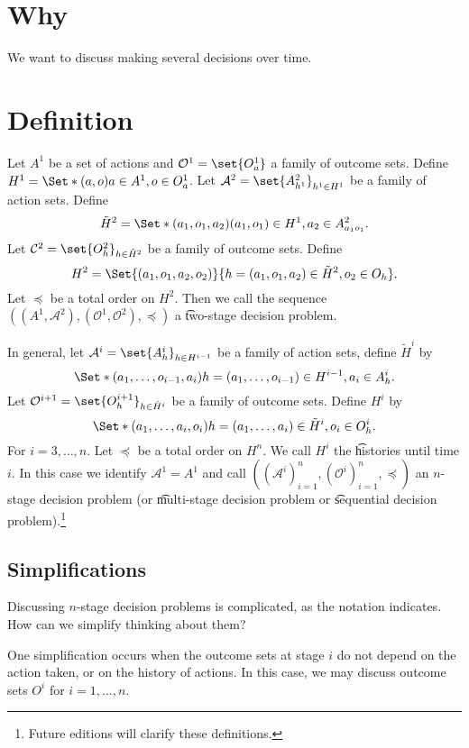 
\section*{Why}

We want to discuss making several decisions over time.

\section*{Definition}

Let $A^{1}$ be a set of actions and $\mathcal{O}^1 = \set{O^{1}_a}$ a family of outcome sets.
Define $H^1 = \Set*{(a, o)}{a \in A^1, o \in O^{1}_a}$.
Let $\mathcal{A} ^2 = \set{A^{2}_{h^1}}_{h^1 \in H^1}$ be a family of action sets.
Define
\[
\tilde{H}^{2} = \Set*{(a_1, o_1, a_2)}{(a_1, o_1) \in H^1, a_2 \in A^{2}_{a_1o_1}}.
\]
Let $\mathcal{C}^2 = \set{O^{2}_{h}}_{h \in \tilde{H}^2}$ be a family of outcome sets.
Define
\[
H^2 = \Set{(a_1, o_1, a_2, o_2)}{h = (a_1, o_1, a_2) \in \tilde{H}^2, o_2 \in O_{h}}.
\]
Let $\preceq$ be a total order on $H^2$.
Then we call the sequence $((A^1, \mathcal{A} ^2), (\mathcal{O}^1, \mathcal{O}^2), \preceq)$ a \t{two-stage decision problem}.

In general, let $\mathcal{A} ^{i} = \set{A^i_{h}}_{h \in H^{i-1}}$ be a family of action sets, define $\tilde{H}^i$ by
\[
\Set*{(a_1, \dots , o_{i-1}, a_i)}{h = (a_1, \dots , o_{i-1}) \in H^{i-1}, a_i \in A^i_{h}}.
\]
Let $\mathcal{O}^{i+1} = \set{O^{i+1}_{h}}_{h \in \tilde{H}^{i}}$ be a family of outcome sets. Define $H^{i}$ by
\[
\Set*{(a_1, \dots , a_i, o_i)}{h = (a_1, \dots , a_i) \in \tilde{H}^{i}, o_i \in O^i_{h}}.
\]
For $i = 3, \dots , n$.
Let $\preceq$ be a total order on $H^{n}$.
We call $H^i$ the \t{histories until time $i$}.
In this case we identify $\mathcal{A} ^1 = A^1$ and call $((\mathcal{A} ^i)_{i = 1}^{n}, (\mathcal{O}^i)_{i = 1}^{n}, \preceq)$ an \t{$n$-stage decision problem} (or \t{multi-stage decision problem} or \t{sequential decision problem}).\footnote{Future editions will clarify these definitions.}

\subsection*{Simplifications}

Discussing $n$-stage decision problems is complicated, as the notation indicates.
How can we simplify thinking about them?

One simplification occurs when the outcome sets at stage $i$ do not depend on the action taken, or on the history of actions.
In this case, we may discuss outcome sets $O^i$ for $i = 1, \dots , n$.

